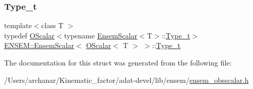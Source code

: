 \subsubsection{\texorpdfstring{Type\_t}{Type\_t}\hspace{0.1cm}{\footnotesize\ttfamily [3/3]}}
{\footnotesize\ttfamily template$<$class T $>$ \\
typedef \mbox{\hyperlink{classENSEM_1_1OScalar}{O\+Scalar}}$<$typename \mbox{\hyperlink{structENSEM_1_1EnsemScalar}{Ensem\+Scalar}}$<$T$>$\+::\mbox{\hyperlink{structENSEM_1_1EnsemScalar_3_01OScalar_3_01T_01_4_01_4_ae59bb2dba9a4ddf192256b4beaf9a856}{Type\+\_\+t}}$>$ \mbox{\hyperlink{structENSEM_1_1EnsemScalar}{E\+N\+S\+E\+M\+::\+Ensem\+Scalar}}$<$ \mbox{\hyperlink{classENSEM_1_1OScalar}{O\+Scalar}}$<$ T $>$ $>$\+::\mbox{\hyperlink{structENSEM_1_1EnsemScalar_3_01OScalar_3_01T_01_4_01_4_ae59bb2dba9a4ddf192256b4beaf9a856}{Type\+\_\+t}}}



The documentation for this struct was generated from the following file\+:\begin{DoxyCompactItemize}
\item 
/\+Users/archanar/\+Kinematic\+\_\+factor/adat-\/devel/lib/ensem/\mbox{\hyperlink{adat-devel_2lib_2ensem_2ensem__obsscalar_8h}{ensem\+\_\+obsscalar.\+h}}\end{DoxyCompactItemize}
